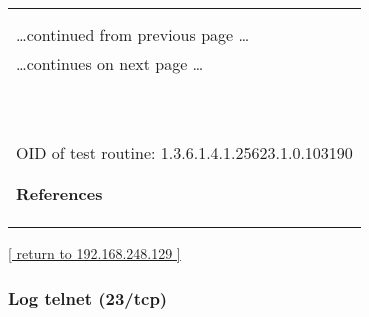 \documentclass{article}
\begin{document}
\begin{longtable}{|p{}|}
\hline
\rowcolor{openvas_log}{\color{white}{Log (CVSS: 0.0) }}\\
\rowcolor{openvas_log}{\color{white}{NVT: ICMP Timestamp Detection}}\\
\hline
\endfirsthead
\hfill\ldots continued from previous page \ldots \\
\hline
\endhead
\hline
\ldots continues on next page \ldots \\
\endfoot
\hline
\endlastfoot
\\
\rowcolor{white}{\verb= Summary:=}\\
\rowcolor{white}{\verb= The remote host responded to an ICMP timestamp request. The Timestamp Reply is=}\\
\rowcolor{white}{\verb=an ICMP message which replies to a Timestamp message. It consists of the=}\\
\rowcolor{white}{\verb=originating timestamp sent by the sender of the Timestamp as well as a receive=}\\
\rowcolor{white}{\verb=timestamp and a transmit timestamp. This information could theoretically be used=}\\
\rowcolor{white}{\verb=to exploit weak time-based random number generators in other services.=}\\
\rowcolor{white}{\verb==}\\
\rowcolor{white}{\verb==}\\
\\
OID of test routine: 1.3.6.1.4.1.25623.1.0.103190\\
\\

      \hline
      \\
\textbf{References}\\
\rowcolor{white}{\verb=CVE: CVE-1999-0524=}\\
\rowcolor{white}{\verb=Other:=}\\
\rowcolor{white}{\verb=  URL:http://www.ietf.org/rfc/rfc0792.txt=}\\
\end{longtable}

\begin{footnotesize}\hyperref[host:192.168.248.129]{[ return to 192.168.248.129 ]}\end{footnotesize}
\subsubsection{Log telnet (23/tcp)}
\label{port:192.168.248.129 telnet (23/tcp) Log}
\end{document}
